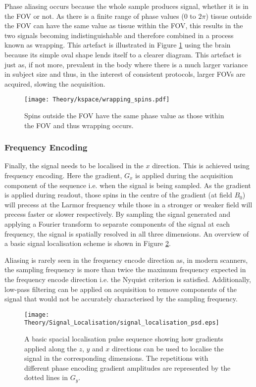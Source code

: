 Phase aliasing occurs because the whole sample produces signal, whether it is in the \ac{FOV} or not. As there is a finite range of phase values ($0$ to $2\pi$) tissue outside the \ac{FOV} can have the same value as tissue within the \ac{FOV}, this results in the two signals becoming indistinguishable and therefore combined in a process known as wrapping. This artefact is illustrated in Figure \ref{fig:theory_wrapping_spins} using the brain because its simple oval shape lends itself to a clearer diagram. This artefact is just as, if not more, prevalent in the body where there is a much larger variance in subject size and thus, in the interest of consistent protocols, larger \acp{FOV} are acquired, slowing the acquisition.
\begin{figure}[H]
	\centering
	\texttt{[image: Theory/kspace/wrapping\_spins.pdf]}
	\caption{Spins outside the \ac{FOV} have the same phase value as those within the \ac{FOV} and thus wrapping occurs.}
	\label{fig:theory_wrapping_spins}	
\end{figure}

\subsubsection{Frequency Encoding}
Finally, the signal needs to be localised in the $x$ direction. This is achieved using frequency encoding. Here the gradient, $G_x$ is applied during the acquisition component of the sequence i.e. when the signal is being sampled. As the gradient is applied during readout, those spins in the centre of the gradient (at field $B_0$) will precess at the Larmor frequency while those in a stronger or weaker field will precess faster or slower respectively. By sampling the signal generated and applying a Fourier transform to separate components of the signal at each frequency, the signal is spatially resolved in all three dimensions. An overview of a basic signal localisation scheme is shown in Figure \ref{fig:theory_signal_loc}. 

Aliasing is rarely seen in the frequency encode direction as, in modern scanners, the sampling frequency is more than twice the maximum frequency expected in the frequency encode direction i.e. the Nyquist criterion is satisfied. Additionally, low-pass filtering can be applied on acquisition to remove components of the signal that would not be accurately characterised by the sampling frequency.

\begin{figure}[H]
	\centering
	\texttt{[image: Theory/Signal\_Localisation/signal\_localisation\_psd.eps]}
	\caption{A basic spacial localisation pulse sequence showing how gradients applied along the $z$, $y$ and $x$ directions can be used to localise the signal in the corresponding dimensions. The repetitions with different phase encoding gradient amplitudes are represented by the dotted lines in $G_y$.}
	\label{fig:theory_signal_loc}	
\end{figure}

